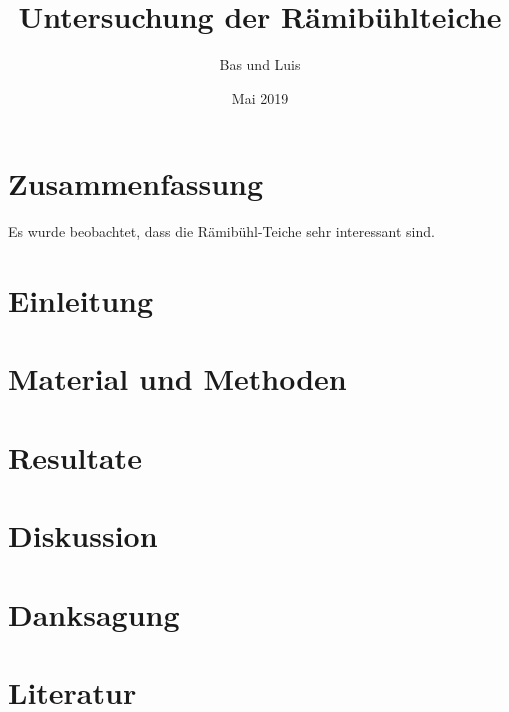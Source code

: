 \documentclass{article}
\title{Untersuchung der Rämibühlteiche}
\author{Bas und Luis}
\date{Mai 2019}
\begin{document}
\maketitle

\section{Zusammenfassung}
Es wurde beobachtet, dass die Rämibühl-Teiche sehr interessant sind.

\section{Einleitung}





\section{Material und Methoden}

\section{Resultate}

\section{Diskussion}

\section{Danksagung}

\section{Literatur}
\end{document}
